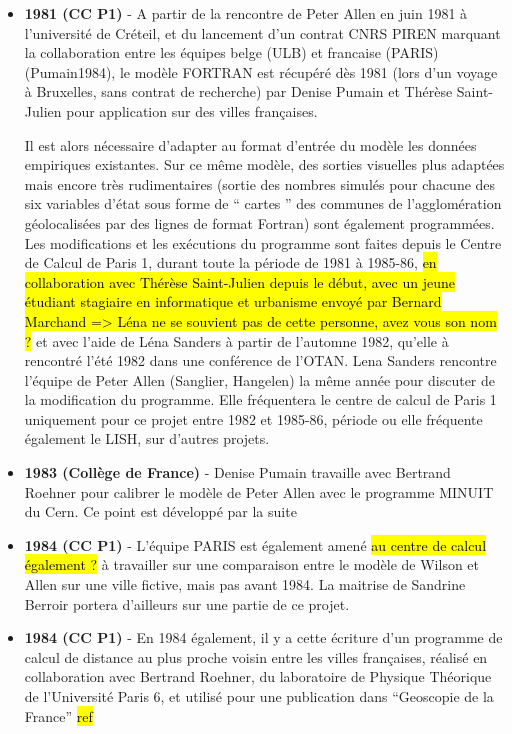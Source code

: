 \begin{itemize}[label=\textbullet]

\item \textbf{1981 (CC P1)} - A partir de la rencontre  de Peter Allen en juin 1981 à l’université de Créteil, et du lancement d’un contrat CNRS PIREN marquant la collaboration entre les équipes belge (ULB) et francaise (PARIS) (Pumain1984), le modèle FORTRAN est récupéré dès 1981 (lors d’un voyage à Bruxelles, sans contrat de recherche) par Denise Pumain et Thérèse Saint-Julien pour application sur des villes françaises.

Il est alors nécessaire d’adapter au format d’entrée du modèle les données empiriques existantes. Sur ce même modèle, des sorties visuelles plus adaptées mais encore très rudimentaires (sortie des nombres simulés pour chacune des six variables d’état sous forme de \enquote{ cartes } des communes de l’agglomération géolocalisées par des lignes de format Fortran) sont également programmées. Les modifications et les exécutions du programme sont faites depuis le Centre de Calcul de Paris 1, durant toute la période de 1981 à 1985-86, \hl{en collaboration avec Thérèse Saint-Julien depuis le début, avec un jeune étudiant stagiaire en informatique et urbanisme envoyé par Bernard Marchand => Léna ne se souvient pas de cette personne, avez vous son nom ?} et avec l’aide de Léna Sanders à partir de l’automne 1982, qu'elle à rencontré l'été 1982 dans une conférence de l'OTAN. Lena Sanders rencontre l'équipe de Peter Allen (Sanglier, Hangelen) la même année pour discuter de la modification du programme. Elle fréquentera le centre de calcul de Paris 1 uniquement pour ce projet entre 1982 et 1985-86, période ou elle fréquente également le LISH, sur d'autres projets.

\item \textbf{1983 (Collège de France)} - Denise Pumain travaille avec Bertrand Roehner pour calibrer le modèle de Peter Allen avec le programme MINUIT du Cern. Ce point est développé par la suite

\item \textbf{1984 (CC P1)} - L'équipe PARIS est également amené \hl{au centre de calcul également ?} à travailler sur une comparaison entre le modèle de Wilson et Allen sur une ville fictive, mais pas avant 1984. La maitrise de Sandrine Berroir portera d'ailleurs sur une partie de ce projet.

\item \textbf{1984 (CC P1)} - En 1984 également, il y a cette écriture d’un programme de calcul de distance au plus proche voisin entre les villes françaises, réalisé en collaboration avec Bertrand Roehner, du laboratoire de Physique Théorique de l’Université Paris 6, et utilisé pour une publication dans “Geoscopie de la France” \hl{ref}


\end{itemize}
